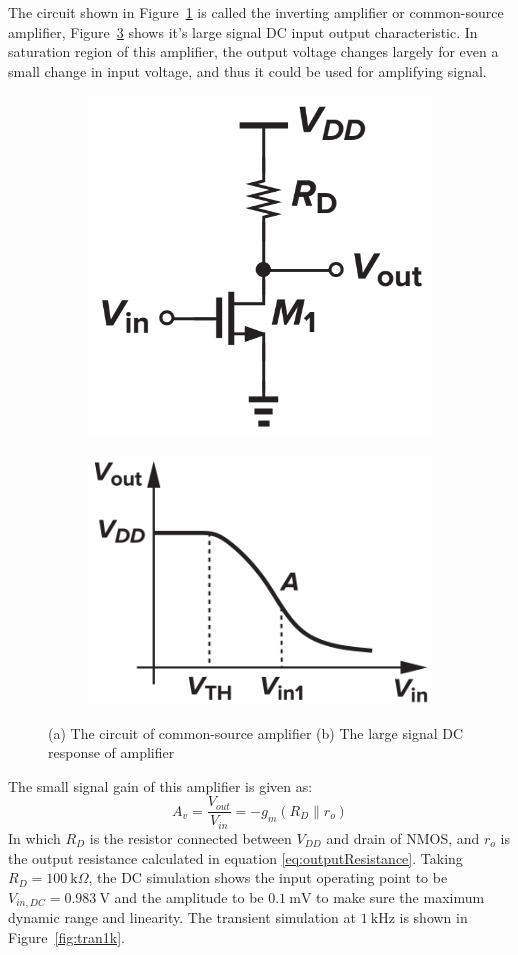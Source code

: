 \documentclass[12pt]{article}   %
\begin{document}
	The circuit shown in Figure~\ref{fig:invAmp} is called the inverting amplifier or common-source amplifier, Figure~\ref{fig:dcResponse} shows it's large signal DC input output characteristic. In saturation region of this amplifier, the output voltage changes largely for even a small change in input voltage, and thus it could be used for amplifying signal.
	\begin{figure}[htbp]
		\centering
		\begin{subfigure}[c]{0.48\linewidth}
			\centering
			\includegraphics[width=0.5\linewidth]{Figures/E2_Inverting_Amplifier/Inv_amp}
			\caption{}
			\label{fig:invAmp}
		\end{subfigure}
		\begin{subfigure}[c]{0.48\linewidth}
			\centering
			\includegraphics[width=0.7\linewidth]{Figures/E2_Inverting_Amplifier/DC_response}
			\caption{}
			\label{fig:dcResponse}
		\end{subfigure}
		\caption{(a) The circuit of common-source amplifier (b) The large signal DC response of amplifier}
	\end{figure}
	
	The small signal gain of this amplifier is given as:
	\begin{equation}
		A_v = \frac{V_{out}}{V_{in}} = -g_m \left(R_D \parallel r_o\right)
		\label{eq:invAmpGain}
	\end{equation}
	In which $R_{D}$ is the resistor connected between $V_{DD}$ and drain of NMOS, and $r_o$ is the output resistance calculated in equation \eqref{eq:outputResistance}. Taking $R_D = \SI{100}{\kilo\Omega}$, the DC simulation shows the input operating point to be $V_{in,DC} = \SI{0.983}{\volt}$ and the amplitude to be $\SI{0.1}{\milli\volt}$ to make sure the maximum dynamic range and linearity. The transient simulation at $\SI{1}{\kilo\hertz}$ is shown in Figure~\ref{fig:tran1k}.
	
\end{document}
